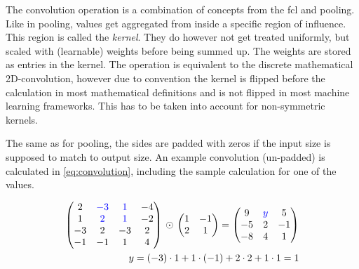 The convolution operation is a combination of concepts from the fcl and pooling.
Like in pooling, values get aggregated from inside a specific region of influence.
This region is called the \emph{kernel}.
They do however not get treated uniformly, but scaled with (learnable) weights before being summed up.
The weights are stored as entries in the kernel. 
The operation is equivalent to the discrete mathematical 2D-convolution, however due to convention the kernel is flipped before the calculation in most mathematical definitions \cite{multidimConv} and is not flipped in most machine learning frameworks.
This has to be taken into account for non-symmetric kernels.

The same as for pooling, the sides are padded with zeros if the input size is supposed to match to output size. 
An example convolution (un-padded) is calculated in \autoref{eq:convolution}, including the sample calculation for one of the values.

\begin{equation}
    \label{eq:convolution}
    \begin{split}
        \left(\begin{matrix}
            2 & \textcolor{blue}{-3} & \textcolor{blue}{1} & -4 \\
            1 & \textcolor{blue}{2} & \textcolor{blue}{1} & -2 \\
            -3 & 2 & -3 & 2 \\
            -1 & -1 & 1 & 4 \\
        \end{matrix}\right)\,\odot\,
        \left(\begin{matrix}
            1 & -1  \\
            2 & 1   \\
        \end{matrix}\right) = 
        \left(\begin{matrix}
            9 & \textcolor{blue}{y} & 5 \\
            -5 & 2 & -1 \\
            -8 & 4 & 1 \\
        \end{matrix}\right)\\
        y = (-3)\cdot 1 + 1 \cdot (-1) + 2 \cdot 2 + 1 \cdot 1 = 1
    \end{split}
\end{equation}

